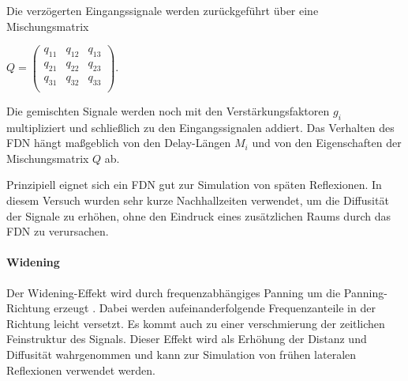 
Die verzögerten Eingangssignale werden zurückgeführt über eine Mischungsmatrix

$Q = \begin{pmatrix} q_{11} & q_{12} & q_{13} \\
                     q_{21} & q_{22} & q_{23} \\
                     q_{31} & q_{32} & q_{33} \\
     \end{pmatrix}$.

Die gemischten Signale werden noch mit den Verstärkungsfaktoren $g_i$ multipliziert und schließlich zu den Eingangssignalen addiert. Das Verhalten des FDN hängt maßgeblich von den Delay-Längen $M_i$ und von den Eigenschaften der Mischungsmatrix $Q$ ab.

Prinzipiell eignet sich ein FDN gut zur Simulation von späten Reflexionen. In diesem Versuch wurden sehr kurze Nachhallzeiten verwendet, um die Diffusität der Signale zu erhöhen, ohne den Eindruck eines zusätzlichen Raums durch das FDN zu verursachen.

\paragraph{Widening}
Der Widening-Effekt wird durch frequenzabhängiges Panning um die Panning-Richtung erzeugt \cite{ambi-book}. Dabei werden aufeinanderfolgende Frequenzanteile in der Richtung leicht versetzt. Es kommt auch zu einer verschmierung der zeitlichen Feinstruktur des Signals. Dieser Effekt wird als Erhöhung der Distanz und Diffusität wahrgenommen und kann zur Simulation von frühen lateralen Reflexionen verwendet werden.
